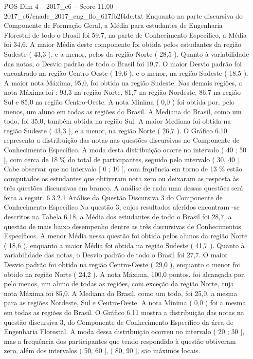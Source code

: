 \begin{textsample}{POS Dim 4 – 2017\_c6 – Score 11.00 – 2017\_c6/enade\_2017\_eng\_flo\_617fb2f4dc.txt}
Enquanto na parte discursiva do Componente de Formação Geral, a Média para estudantes de Engenharia Florestal de todo o Brasil foi 59,7, na parte de Conhecimento Específico, a Média foi 34,6.
A maior Média deste componente foi obtida pelos estudantes da região Sudeste ( 43,3 ), e a menor, pelos da região Norte ( 28,5 ).
Quanto à variabilidade das notas, o Desvio padrão de todo o Brasil foi 19,7.
O maior Desvio padrão foi encontrado na região Centro-Oeste ( 19,6 ), e o menor, na região Sudeste ( 18,5 ).
A maior nota Máxima, 95,0, foi obtida na região Sudeste.
Nas demais regiões, a nota Máxima foi : 93,3 na região Norte, 81,7 na região Nordeste, 86,7 na região Sul e 85,0 na região Centro-Oeste.
A nota Mínima ( 0,0 ) foi obtida por, pelo menos, um aluno em todas as regiões do Brasil.
A Mediana do Brasil, como um todo, foi 35,0, também obtida na região Sul.
A maior Mediana foi obtida na região Sudeste ( 43,3 ), e a menor, na região Norte ( 26,7 ).
O Gráfico 6.10 representa a distribuição das notas nas questões discursivas no Componente de Conhecimento Específico.
A moda desta distribuição ocorre no intervalo ( 40 ; 50 ], com cerca de 18 \% do total de participantes, seguido pelo intervalo ( 30, 40 ].
Cabe observar que no intervalo [ 0 ; 10 ], com frquência em torno de 13 \% estão computados os estudantes que obtiveram nota zero ou deixaram as resposta às três questões discursivas em branco.
A análise de cada uma dessas questões será feita a seguir. 6.3.2.1 Análise da Questão Discursiva 3 do Componente de Conhecimento Específico Na questão 3, cujos resultados aferidos encontram -se descritos na Tabela 6.18, a Média dos estudantes de todo o Brasil foi 28,7, a questão de mais baixo desempenho dentre as três discursivas de Conhecimentos Específicos.
A menor Média nessa questão foi obtida pelos alunos da região Norte ( 18,6 ), enquanto a maior Média foi obtida na região Sudeste ( 41,7 ).
Quanto à variabilidade das notas, o Desvio padrão de todo o Brasil foi 27,7.
O maior Desvio padrão foi obtido na região Centro-Oeste ( 29,0 ), enquanto o menor foi obtido na região Norte ( 24,2 ).
A nota Máxima, 100,0 pontos, foi alcançada por, pelo menos, um aluno de todas as regiões, com exceção da região Norte, cuja nota Máxima foi 85,0.
A Mediana do Brasil, como um todo, foi 25,0, a mesma para as regiões Nordeste, Sul e Centro-Oeste.
A nota Mínima ( 0,0 ) foi a mesma em todas as regiões do Brasil.
O Gráfico 6.11 mostra a distribuição das notas na questão discursiva 3, do Componente de Conhecimento Específico da área de Engenharia Florestal.
A moda dessa distribuição ocorreu no intervalo ( 20 ; 30 ], mas a frequência dos participantes que tendo respondido à questão obtiveram zero, além dos intervalos ( 50, 60 ], ( 80, 90 ], são máximos locais.

\end{textsample}
